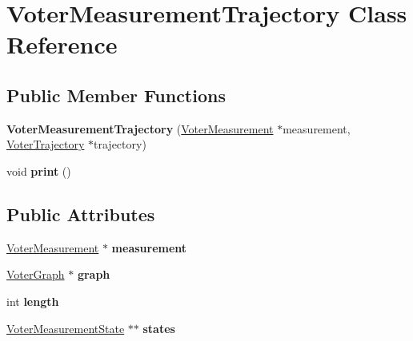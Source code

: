 \hypertarget{classVoterMeasurementTrajectory}{\section{Voter\-Measurement\-Trajectory Class Reference}
\label{classVoterMeasurementTrajectory}
}
\subsection*{Public Member Functions}
\begin{DoxyCompactItemize}
\item 
\hypertarget{classVoterMeasurementTrajectory_aaad656cfffcd452d36642e48d3593fc5}{{\bfseries Voter\-Measurement\-Trajectory} (\hyperlink{classVoterMeasurement}{Voter\-Measurement} $\ast$measurement, \hyperlink{classVoterTrajectory}{Voter\-Trajectory} $\ast$trajectory)}\label{classVoterMeasurementTrajectory_aaad656cfffcd452d36642e48d3593fc5}

\item 
\hypertarget{classVoterMeasurementTrajectory_afc46bed33c05a96e7a4ea735ba7ac144}{void {\bfseries print} ()}\label{classVoterMeasurementTrajectory_afc46bed33c05a96e7a4ea735ba7ac144}

\end{DoxyCompactItemize}
\subsection*{Public Attributes}
\begin{DoxyCompactItemize}
\item 
\hypertarget{classVoterMeasurementTrajectory_ada8cb1fb7a9559a8ae6501b9b3d8f0db}{\hyperlink{classVoterMeasurement}{Voter\-Measurement} $\ast$ {\bfseries measurement}}\label{classVoterMeasurementTrajectory_ada8cb1fb7a9559a8ae6501b9b3d8f0db}

\item 
\hypertarget{classVoterMeasurementTrajectory_a0bafd05cf7d38e76469dbcca21ac5c92}{\hyperlink{classVoterGraph}{Voter\-Graph} $\ast$ {\bfseries graph}}\label{classVoterMeasurementTrajectory_a0bafd05cf7d38e76469dbcca21ac5c92}

\item 
\hypertarget{classVoterMeasurementTrajectory_a5447124d24ed50c0ef86ec72f3e0e973}{int {\bfseries length}}\label{classVoterMeasurementTrajectory_a5447124d24ed50c0ef86ec72f3e0e973}

\item 
\hypertarget{classVoterMeasurementTrajectory_aaca3b94c576c8d83b8cdac6455a503bb}{\hyperlink{classVoterMeasurementState}{Voter\-Measurement\-State} $\ast$$\ast$ {\bfseries states}}\label{classVoterMeasurementTrajectory_aaca3b94c576c8d83b8cdac6455a503bb}

\end{DoxyCompactItemize}


